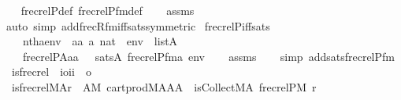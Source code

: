 \begin{isabellebody}
%
\isadelimproof
\ \ %
\endisadelimproof
%
\isatagproof
{}\isamarkupfalse%
\ frecrelP{\isacharunderscore}{\kern0pt}def\ frecrelP{\isacharunderscore}{\kern0pt}fm{\isacharunderscore}{\kern0pt}def\isanewline
\ \ \isamarkupfalse%
\ assms\ \isamarkupfalse%
\ {\isacharparenleft}{\kern0pt}auto\ simp\ add{\isacharcolon}{\kern0pt}frecR{\isacharunderscore}{\kern0pt}fm{\isacharunderscore}{\kern0pt}iff{\isacharunderscore}{\kern0pt}sats{\isacharbrackleft}{\kern0pt}symmetric{\isacharbrackright}{\kern0pt}{\isacharparenright}{\kern0pt}%
\endisatagproof
{\isafoldproof}%
%
\isadelimproof
\isanewline
%
\endisadelimproof
\isanewline
{}\isamarkupfalse%
\ frecrelP{\isacharunderscore}{\kern0pt}iff{\isacharunderscore}{\kern0pt}sats{\isacharcolon}{\kern0pt}\isanewline
\ \ \isanewline
\ \ \ \ {\isachardoublequoteopen}nth{\isacharparenleft}{\kern0pt}a{\isacharcomma}{\kern0pt}env{\isacharparenright}{\kern0pt}\ {\isacharequal}{\kern0pt}\ aa{\isachardoublequoteclose}\ {\isachardoublequoteopen}a{\isasymin}\ nat{\isachardoublequoteclose}\ \ {\isachardoublequoteopen}env\ {\isasymin}\ list{\isacharparenleft}{\kern0pt}A{\isacharparenright}{\kern0pt}{\isachardoublequoteclose}\isanewline
\ \ \isanewline
\ \ \ \ {\isachardoublequoteopen}frecrelP{\isacharparenleft}{\kern0pt}{\isacharhash}{\kern0pt}{\isacharhash}{\kern0pt}A{\isacharcomma}{\kern0pt}aa{\isacharparenright}{\kern0pt}\ \ {\isasymlongleftrightarrow}\ sats{\isacharparenleft}{\kern0pt}A{\isacharcomma}{\kern0pt}\ frecrelP{\isacharunderscore}{\kern0pt}fm{\isacharparenleft}{\kern0pt}a{\isacharparenright}{\kern0pt}{\isacharcomma}{\kern0pt}\ env{\isacharparenright}{\kern0pt}{\isachardoublequoteclose}\isanewline
%
\isadelimproof
\ \ %
\endisadelimproof
%
\isatagproof
{}\isamarkupfalse%
\ assms\isanewline
\ \ \isamarkupfalse%
\ {\isacharparenleft}{\kern0pt}simp\ add{\isacharcolon}{\kern0pt}sats{\isacharunderscore}{\kern0pt}frecrelP{\isacharunderscore}{\kern0pt}fm{\isacharparenright}{\kern0pt}%
\endisatagproof
{\isafoldproof}%
%
\isadelimproof
\isanewline
%
\endisadelimproof
\isanewline
{}\isamarkupfalse%
\isanewline
\ \ is{\isacharunderscore}{\kern0pt}frecrel\ {\isacharcolon}{\kern0pt}{\isacharcolon}{\kern0pt}\ {\isachardoublequoteopen}{\isacharbrackleft}{\kern0pt}i{\isasymRightarrow}o{\isacharcomma}{\kern0pt}i{\isacharcomma}{\kern0pt}i{\isacharbrackright}{\kern0pt}\ {\isasymRightarrow}\ o{\isachardoublequoteclose}\ \isanewline
\ \ {\isachardoublequoteopen}is{\isacharunderscore}{\kern0pt}frecrel{\isacharparenleft}{\kern0pt}M{\isacharcomma}{\kern0pt}A{\isacharcomma}{\kern0pt}r{\isacharparenright}{\kern0pt}\ {\isasymequiv}\ {\isasymexists}A{}{\isacharbrackleft}{\kern0pt}M{\isacharbrackright}{\kern0pt}{\isachardot}{\kern0pt}\ cartprod{\isacharparenleft}{\kern0pt}M{\isacharcomma}{\kern0pt}A{\isacharcomma}{\kern0pt}A{\isacharcomma}{\kern0pt}A{}{\isacharparenright}{\kern0pt}\ {\isasymand}\ is{\isacharunderscore}{\kern0pt}Collect{\isacharparenleft}{\kern0pt}M{\isacharcomma}{\kern0pt}A{}{\isacharcomma}{\kern0pt}\ frecrelP{\isacharparenleft}{\kern0pt}M{\isacharparenright}{\kern0pt}\ {\isacharcomma}{\kern0pt}r{\isacharparenright}{\kern0pt}{\isachardoublequoteclose}\isanewline

\end{isabellebody}
